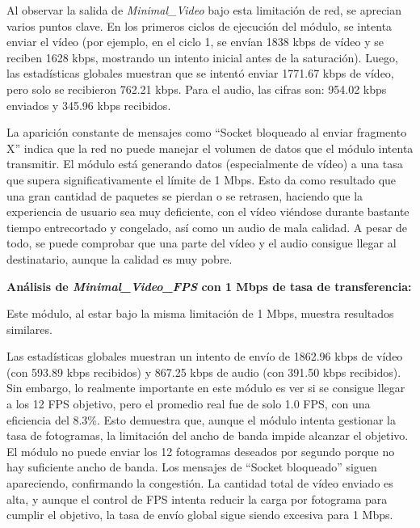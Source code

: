 Al observar la salida de \textit{Minimal\_Video} bajo esta limitación de red, se aprecian varios puntos clave. En los primeros ciclos de ejecución del módulo, se intenta enviar el vídeo (por ejemplo, en el ciclo 1, se envían 1838 kbps de vídeo y se reciben 1628 kbps, mostrando un intento inicial antes de la saturación). Luego, las estadísticas globales muestran que se intentó enviar 1771.67 kbps de vídeo, pero solo se recibieron 762.21 kbps. Para el audio, las cifras son: 954.02 kbps enviados y 345.96 kbps recibidos.
\vspace{\baselineskip}

La aparición constante de mensajes como ``Socket bloqueado al enviar fragmento X'' indica que la red no puede manejar el volumen de datos que el módulo intenta transmitir. El módulo está generando datos (especialmente de vídeo) a una tasa que supera significativamente el límite de 1 Mbps. Esto da como resultado que una gran cantidad de paquetes se pierdan o se retrasen, haciendo que la experiencia de usuario sea muy deficiente, con el vídeo viéndose durante bastante tiempo entrecortado y congelado, así como un audio de mala calidad. A pesar de todo, se puede comprobar que una parte del vídeo y el audio consigue llegar al destinatario, aunque la calidad es muy pobre.

\vspace{\baselineskip}

\textbf{Análisis de \textit{Minimal\_Video\_FPS} con 1 Mbps de tasa de transferencia:}
\vspace{\baselineskip}

Este módulo, al estar bajo la misma limitación de 1 Mbps, muestra resultados similares.
\vspace{\baselineskip}

Las estadísticas globales muestran un intento de envío de 1862.96 kbps de vídeo (con 593.89 kbps recibidos) y 867.25 kbps de audio (con 391.50 kbps recibidos). Sin embargo, lo realmente importante en este módulo es ver si se consigue llegar a los 12 FPS objetivo, pero el promedio real fue de solo 1.0 FPS, con una eficiencia del 8.3\%. Esto demuestra que, aunque el módulo intenta gestionar la tasa de fotogramas, la limitación del ancho de banda impide alcanzar el objetivo. El módulo no puede enviar los 12 fotogramas deseados por segundo porque no hay suficiente ancho de banda. Los mensajes de ``Socket bloqueado'' siguen apareciendo, confirmando la congestión. La cantidad total de vídeo enviado es alta, y aunque el control de FPS intenta reducir la carga por fotograma para cumplir el objetivo, la tasa de envío global sigue siendo excesiva para 1 Mbps.

